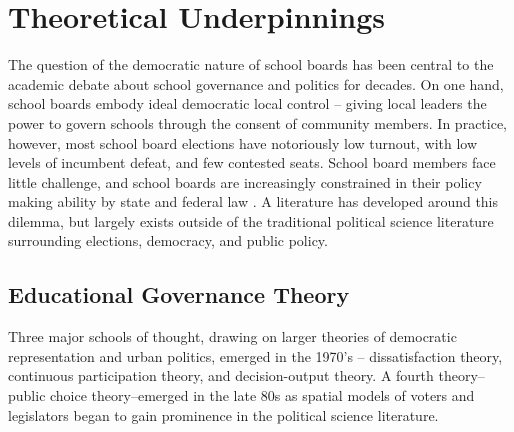 \section{Theoretical Underpinnings}
The question of the democratic nature of school boards has been central to the 
academic debate about school governance and politics for decades. On one hand, 
school boards embody ideal democratic local control -- giving local leaders the 
power to govern schools through the consent of community members. In practice, 
however, most school board elections have notoriously low turnout, with low 
levels of incumbent defeat, and few contested seats. School board members face 
little challenge, and school boards are increasingly constrained in their policy 
making ability by state and federal law \citep{RefWorks:318}. A literature has 
developed around this dilemma, but largely exists outside of the traditional 
political science literature surrounding elections, democracy, and public policy.

\subsection{Educational Governance Theory}
Three major schools of thought, drawing on larger theories of democratic 
representation and urban politics, emerged in the 1970's -- dissatisfaction theory, 
continuous participation theory, and decision-output theory. A fourth theory--public 
choice theory--emerged in the late 80s as spatial models of voters and legislators 
began to gain prominence in the political science literature.

